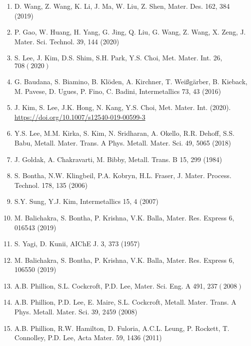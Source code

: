 \documentclass[10pt]{article}
\begin{document}
\begin{enumerate}
  \item D. Wang, Z. Wang, K. Li, J. Ma, W. Liu, Z. Shen, Mater. Des. 162, 384 (2019)

  \item P. Gao, W. Huang, H. Yang, G. Jing, Q. Liu, G. Wang, Z. Wang, X. Zeng, J. Mater. Sci. Technol. 39, 144 (2020)

  \item S. Lee, J. Kim, D.S. Shim, S.H. Park, Y.S. Choi, Met. Mater. Int. 26, $708(2020)$

  \item G. Baudana, S. Biamino, B. Klöden, A. Kirchner, T. Weißgärber, B. Kieback, M. Pavese, D. Ugues, P. Fino, C. Badini, Intermetallics 73, 43 (2016)

  \item J. Kim, S. Lee, J.K. Hong, N. Kang, Y.S. Choi, Met. Mater. Int. (2020). \href{https://doi.org/10.1007/s12540-019-00599-3}{https://doi.org/10.1007/s12540-019-00599-3}

  \item Y.S. Lee, M.M. Kirka, S. Kim, N. Sridharan, A. Okello, R.R. Dehoff, S.S. Babu, Metall. Mater. Trans. A Phys. Metall. Mater. Sci. 49, 5065 (2018)

  \item J. Goldak, A. Chakravarti, M. Bibby, Metall. Trans. B 15, 299 (1984)

  \item S. Bontha, N.W. Klingbeil, P.A. Kobryn, H.L. Fraser, J. Mater. Process. Technol. 178, 135 (2006)

  \item S.Y. Sung, Y.J. Kim, Intermetallics 15, 4 (2007)

  \item M. Balichakra, S. Bontha, P. Krishna, V.K. Balla, Mater. Res. Express 6, 016543 (2019)

  \item S. Yagi, D. Kunii, AIChE J. 3, 373 (1957)

  \item M. Balichakra, S. Bontha, P. Krishna, V.K. Balla, Mater. Res. Express 6, 106550 (2019)

  \item A.B. Phillion, S.L. Cockcroft, P.D. Lee, Mater. Sci. Eng. A 491, $237(2008)$

  \item A.B. Phillion, P.D. Lee, E. Maire, S.L. Cockcroft, Metall. Mater. Trans. A Phys. Metall. Mater. Sci. 39, 2459 (2008)

  \item A.B. Phillion, R.W. Hamilton, D. Fuloria, A.C.L. Leung, P. Rockett, T. Connolley, P.D. Lee, Acta Mater. 59, 1436 (2011)


\end{enumerate}
\end{document}

